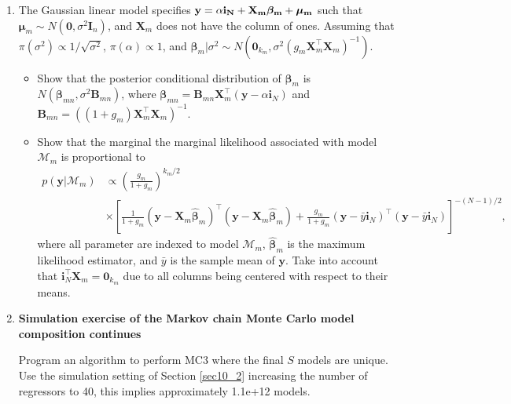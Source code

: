 \begin{enumerate}
	\item The Gaussian linear model specifies $\bf{y}=\alpha\bm{i}_N+\bm{X}_m\bm{\beta}_m+\bm{\mu}_m$ such that $\bm{\mu}_m\sim{N}(\bm{0},\sigma^2\bm{I}_n)$, and $\bm{X}_m$ does not have the column of ones. Assuming that $\pi(\sigma^2)\propto 1/\sqrt{\sigma^2}$, $\pi(\alpha)\propto 1$, and $\bm{\beta}_m|\sigma^2 \sim {N}(\bm{0}_{k_m}, \sigma^2 (g_m\bm{X}_m^{\top}\bm{X}_m)^{-1})$.
	\begin{itemize}
		\item Show that the posterior conditional distribution of $\bm{\beta}_m$ is $N(\bm{\beta}_{mn},\sigma^2\bm{B}_{mn})$, where $\bm{\beta}_{mn}=\bm{B}_{mn}\bm{X}_m^{\top}(\bm{y}-\alpha\bm{i}_N)$ and $\bm{B}_{mn}=((1+g_m)\bm{X}_m^{\top}\bm{X}_m)^{-1}$.
		\item Show that the marginal the marginal likelihood associated with model $\mathcal{M}_m$ is proportional to
		\begin{align*}
			p(\bm{y}|\mathcal{M}_m)&\propto \left(\frac{g_m}{1+g_m}\right)^{k_m/2}\\
			&\times \left[\frac{1}{1+g_m}(\bm{y}-\bm{X}_m\hat{\bm{\beta}}_m)^{\top}(\bm{y}-\bm{X}_m\hat{\bm{\beta}}_m)+\frac{g_m}{1+g_m}(\bm{y}-\bar{y}\bm{i}_N)^{\top}(\bm{y}-\bar{y}\bm{i}_N)\right]^{-(N-1)/2},
		\end{align*}
		where all parameter are indexed to model $\mathcal{M}_m$, $\hat{\bm{\beta}}_m$ is the maximum likelihood estimator, and $\bar{y}$ is the sample mean of $\bm{y}$. Take into account that $\bm{i}_N^{\top}\bm{X}_m=\bm{0}_{k_m}$ due to all columns being centered with respect to their means.   
	\end{itemize}

\item \textbf{Simulation exercise of the Markov chain Monte Carlo model composition continues}

Program an algorithm to perform MC3 where the final $S$ models are unique. Use the simulation setting of Section \ref{sec10_2} increasing the number of regressors to 40, this implies approximately 1.1e+12 models.    
	
\end{enumerate}